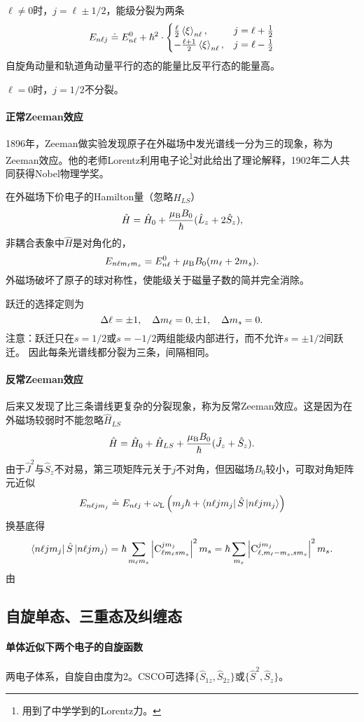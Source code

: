 $\ell\neq 0$时，$j=\ell\pm 1/2$，能级分裂为两条
\[
E_{n\ell j}\doteq E_{n\ell}^0+\hbar^2\cdot\begin{cases}
	\frac{\ell}2\left\langle \xi\right\rangle_{n\ell},& j=\ell+\frac12\\
	-\frac{\ell+1}2\left\langle \xi\right\rangle_{n\ell},& j=\ell-\frac12
\end{cases}
\]
自旋角动量和轨道角动量平行的态的能量比反平行态的能量高。

$\ell=0$时，$j=1/2$不分裂。
\paragraph*{正常Zeeman效应}1896年，Zeeman做实验发现原子在外磁场中发光谱线一分为三的现象，称为Zeeman效应。他的老师Lorentz利用电子论\footnote{用到了中学学到的Lorentz力。}对此给出了理论解释，1902年二人共同获得Nobel物理学奖。

在外磁场下价电子的Hamilton量（忽略$\hat H_{LS}$）
\[
	\hat H=\hat H_0+\frac{\mu_\mathrm B B_0}\hbar(\hat L_z+2\hat S_z),
\]
非耦合表象中$\hat H$是对角化的，
\[
E_{n\ell m_\ell m_s}=E_{n\ell}^0+\mu_\mathrm B B_0(m_\ell+2m_s).
\]
外磁场破坏了原子的球对称性，使能级关于磁量子数的简并完全消除。%

跃迁的选择定则为
\[
	\Delta\ell=\pm 1,\quad \Delta m_\ell=0,\pm 1,\quad \Delta m_s=0.
\]
注意：跃迁只在$s=1/2$或$s=-1/2$两组能级内部进行，而不允许$s=\pm 1/2$间跃迁。
因此每条光谱线都分裂为三条，间隔相同。
\paragraph*{反常Zeeman效应}后来又发现了比三条谱线更复杂的分裂现象，称为反常Zeeman效应。这是因为在外磁场较弱时不能忽略$\hat H_{LS}$
\[
	\hat H=\hat H_0+\hat H_{LS}+\frac{\mu_\mathrm B B_0}\hbar(\hat J_z+\hat S_z).
\]
由于$\hat J^2$与$\hat S_z$不对易，第三项矩阵元关于$j$不对角，但因磁场$B_0$较小，可取对角矩阵元近似
\[
E_{n\ell jm_j}\doteq E_{n\ell j}+\omega_\mathrm L\left(m_j\hbar+\left\langle n\ell jm_j\right\vert\hat S\left\vert n\ell jm_j\right\rangle\right)
\]
换基底得
\[
	\left\langle n\ell jm_j\right\vert\hat S\left\vert n\ell jm_j\right\rangle=\hbar\sum_{m_\ell m_s}\left\lvert\operatorname{C}_{\ell m_\ell sm_s}^{jm_j}\right\rvert^2m_s=\hbar\sum_{m_s}\left\lvert\operatorname{C}_{\ell,m_\ell-m_s,sm_s}^{jm_j}\right\rvert^2m_s.
\]
由
\subsection{自旋单态、三重态及纠缠态}
\paragraph*{单体近似下两个电子的自旋函数}
两电子体系，自旋自由度为2。CSCO可选择$\{\hat S_{1z},\hat S_{2z}\}$或$\{\hat S^2,\hat S_z\}$。

